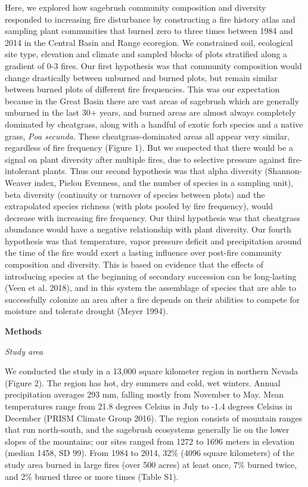 \documentclass[12pt,]{article}
\begin{document}
Here, we explored how sagebrush community composition and diversity
responded to increasing fire disturbance by constructing a fire history
atlas and sampling plant communities that burned zero to three times
between 1984 and 2014 in the Central Basin and Range ecoregion. We
constrained soil, ecological site type, elevation and climate and
sampled blocks of plots stratified along a gradient of 0-3 fires. Our
first hypothesis was that community composition would change drastically
between unburned and burned plots, but remain similar between burned
plots of different fire frequencies. This was our expectation because in
the Great Basin there are vast areas of sagebrush which are generally
unburned in the last 30+ years, and burned areas are almost always
completely dominated by cheatgrass, along with a handful of exotic forb
species and a native grass, \emph{Poa secunda}. These
cheatgrass-dominated areas all appear very similar, regardless of fire
frequency (Figure 1). But we suspected that there would be a signal on
plant diversity after multiple fires, due to selective pressure against
fire-intolerant plants. Thus our second hypothesis was that alpha
diversity (Shannon-Weaver index, Pielou Evenness, and the number of
species in a sampling unit), beta diversity (continuity or turnover of
species between plots) and the extrapolated species richness (with plots
pooled by fire frequency), would decrease with increasing fire
frequency. Our third hypothesis was that cheatgrass abundance would have
a negative relationship with plant diversity. Our fourth hypothesis was
that temperature, vapor pressure deficit and precipitation around the
time of the fire would exert a lasting influence over post-fire
community composition and diversity. This is based on evidence that the
effects of introducing species at the beginning of secondary succession
can be long-lasting (Veen et al. 2018), and in this system the
assemblage of species that are able to successfully colonize an area
after a fire depends on their abilities to compete for moisture and
tolerate drought (Meyer 1994).

\textbf{Methods}

\emph{Study area}

We conducted the study in a 13,000 square kilometer region in northern
Nevada (Figure 2). The region has hot, dry summers and cold, wet
winters. Annual precipitation averages 293 mm, falling mostly from
November to May. Mean temperatures range from 21.8 degrees Celsius in
July to -1.4 degrees Celsius in December (PRISM Climate Group 2016). The
region consists of mountain ranges that run north-south, and the
sagebrush ecosystems generally lie on the lower slopes of the mountains;
our sites ranged from 1272 to 1696 meters in elevation (median 1458, SD
99). From 1984 to 2014, 32\% (4096 square kilometers) of the study area
burned in large fires (over 500 acres) at least once, 7\% burned twice,
and 2\% burned three or more times (Table S1).
\end{document}
